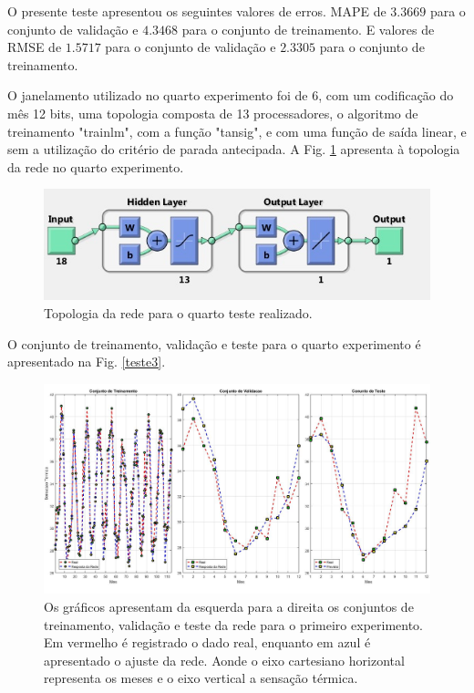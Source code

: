 \documentclass[journal, a4paper]{IEEEtran}
\begin{document}
O presente teste apresentou os seguintes valores de erros. MAPE de $3.3669$ para o conjunto de validação e $4.3468$ para o conjunto de treinamento. E valores de RMSE de $1.5717$ para o conjunto de validação e $2.3305$ para o conjunto de treinamento. 

O janelamento utilizado no quarto experimento foi de 6, com um codificação do mês 12 bits, uma topologia composta de 13 processadores, o algoritmo de treinamento "trainlm", com a função "tansig", e com uma função de saída linear, e sem a utilização do critério de parada antecipada. A Fig. \ref{topo4} apresenta à topologia da rede no quarto experimento. 

\begin{figure}[H]
	\centering
	\includegraphics[scale=0.5]{Images/topologia4.jpg}
	\caption{Topologia da rede para o quarto teste realizado.}
	\label{topo4}
\end{figure} 


O conjunto de treinamento, validação e teste para o quarto experimento é apresentado na Fig. \ref{teste3}.

\begin{figure}[H]
	\centering
	\includegraphics[scale=0.15]{Images/Teste4.jpg}
	\caption{Os gráficos apresentam da esquerda para a direita os conjuntos de treinamento, validação e teste da rede para o primeiro experimento. Em vermelho é registrado o dado real, enquanto em azul é apresentado o ajuste da rede. Aonde o eixo cartesiano horizontal representa os meses e o eixo vertical a sensação térmica.}
	\label{teste4}
\end{figure} 
\end{document}
